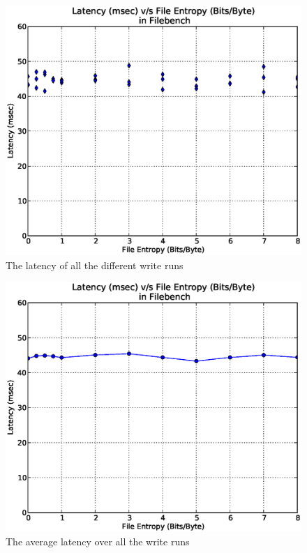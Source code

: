 \begin{figure}[H]
\begin{center}
\includegraphics[scale=.55]{../results/set2/write_latency_2.eps}
\caption{The latency of all the different write runs}
\label{fig:wl2}
\end{center}
\end{figure}


\begin{figure}[H]
\begin{center}
\includegraphics[scale=.55]{../results/set2/write_latency_avg_2.eps}
\caption{The average latency over all the write runs}
\label{fig:wlavg2}
\end{center}
\end{figure}


